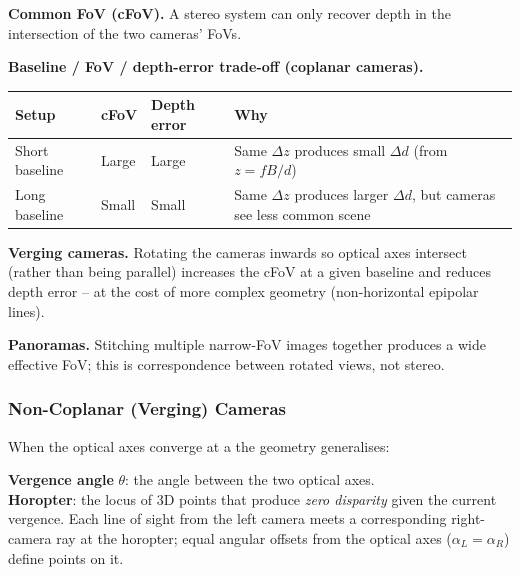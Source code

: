 \textbf{Common FoV (cFoV).} A stereo system can only recover depth in the intersection of the two cameras' FoVs.

\separator

\textbf{Baseline / FoV / depth-error trade-off (coplanar cameras).}

\begin{center}
\renewcommand{\arraystretch}{1.3}
\begin{tabular}{@{} l l l l @{}}
\toprule
\textbf{Setup} & \textbf{cFoV} & \textbf{Depth error} & \textbf{Why} \\
\midrule
Short baseline & Large & Large & Same $\Delta z$ produces small $\Delta d$ (from $z = fB/d$) \\
Long baseline & Small & Small & Same $\Delta z$ produces larger $\Delta d$, but cameras see less common scene \\
\bottomrule
\end{tabular}
\end{center}

\textbf{Verging cameras.} Rotating the cameras inwards so optical axes intersect (rather than being parallel) increases the cFoV at a given baseline and reduces depth error -- at the cost of more complex geometry (non-horizontal epipolar lines).

\textbf{Panoramas.} Stitching multiple narrow-FoV images together produces a wide effective FoV; this is correspondence between rotated views, not stereo.

\bigseparator

\subsubsection{Non-Coplanar (Verging) Cameras}

When the optical axes converge at a  the geometry generalises:

\begin{defbox}
\textbf{Vergence angle} $\theta$: the angle between the two optical axes. \\
\textbf{Horopter}: the locus of 3D points that produce \emph{zero disparity} given the current vergence. Each line of sight from the left camera meets a corresponding right-camera ray at the horopter; equal angular offsets from the optical axes ($\alpha_L = \alpha_R$) define points on it.
\end{defbox}

